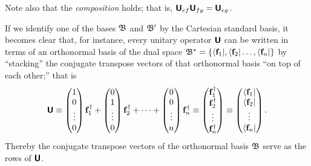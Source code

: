 Note also that the {\em composition} holds; that is, $\textsf{\textbf{U}}_{ef} \textsf{\textbf{U}}_{fg}=  \textsf{\textbf{U}}_{eg}$.


If we
identify one of the bases  ${\frak B}$ and ${\frak B}'$ by the Cartesian standard basis,
it becomes clear that, for instance,
every unitary operator  $\textsf{\textbf{U}}$  can be written in terms of an orthonormal basis  of the dual space
${\frak B}^\ast=\{ \langle {\bf f}_1  \vert     ,   \langle {\bf f}_2  \vert      \ldots ,  \langle {\bf f}_n  \vert     \}$
by ``stacking'' the conjugate transpose vectors of that orthonormal basis ``on top of each other;''
that is
\begin{equation}
\textsf{\textbf{U}}
\equiv
\begin{pmatrix}
1\\
0\\
\vdots\\
0
\end{pmatrix} {\bf f}_1^\dagger
+
\begin{pmatrix}
0\\
1\\
\vdots\\
0
\end{pmatrix} {\bf f}_2^\dagger
+
\cdots +
\begin{pmatrix}
0\\
0\\
\vdots\\
n
\end{pmatrix} {\bf f}_n^\dagger
\equiv
\begin{pmatrix}
{\bf f}_1^\dagger\\
{\bf f}_2^\dagger\\
\vdots\\
{\bf f}_n^\dagger
\end{pmatrix}
\equiv
\begin{pmatrix}
\langle {\bf f}_1\vert \\
\langle {\bf f}_2\vert\\
\vdots\\
\langle {\bf f}_n\vert
\end{pmatrix}
.
\end{equation}
Thereby the conjugate transpose vectors of the orthonormal basis  ${\frak B}$ serve as the
rows of $\textsf{\textbf{U}}$.

